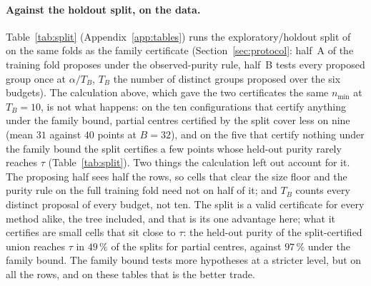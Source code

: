 \documentclass[11pt]{article}
\begin{document}
\paragraph{Against the holdout split, on the data.} Table~\ref{tab:split} (Appendix~\ref{app:tables}) runs the exploratory/holdout split of~\citet{webb2007} on the same folds as the family certificate (Section~\ref{sec:protocol}: half~A of the training fold proposes under the observed-purity rule, half~B tests every proposed group once at $\alpha/T_B$, $T_B$ the number of distinct groups proposed over the six budgets). The calculation above, which gave the two certificates the same $n_{\min}$ at $T_B=10$, is not what happens: on the ten configurations that certify anything under the family bound, partial centres certified by the split cover less on nine (mean $31$ against $40$ points at $B=32$), and on the five that certify nothing under the family bound the split certifies a few points whose held-out purity rarely reaches $\tau$ (Table~\ref{tab:split}). Two things the calculation left out account for it. The proposing half sees half the rows, so cells that clear the size floor and the purity rule on the full training fold need not on half of it; and $T_B$ counts every distinct proposal of every budget, not ten. The split is a valid certificate for every method alike, the tree included, and that is its one advantage here; what it certifies are small cells that sit close to $\tau$: the held-out purity of the split-certified union reaches $\tau$ in $49\,\%$ of the splits for partial centres, against $97\,\%$ under the family bound. The family bound tests more hypotheses at a stricter level, but on all the rows, and on these tables that is the better trade.
\end{document}
